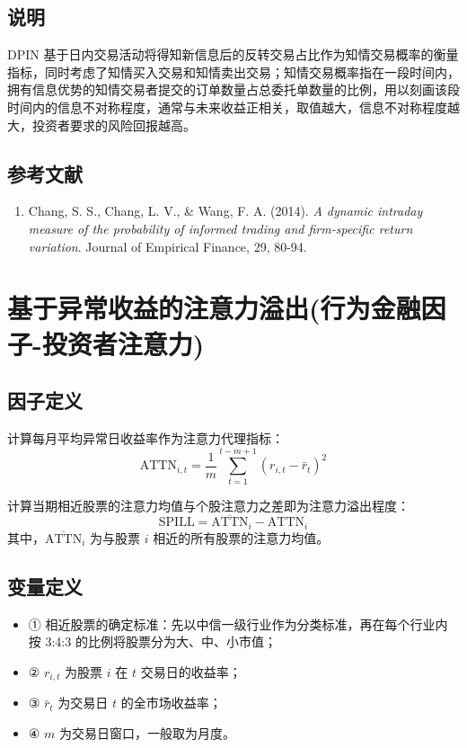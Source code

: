 \documentclass{article}
\begin{document}
\subsection{说明}
DPIN 基于日内交易活动将得知新信息后的反转交易占比作为知情交易概率的衡量指标，同时考虑了知情买入交易和知情卖出交易；知情交易概率指在一段时间内，拥有信息优势的知情交易者提交的订单数量占总委托单数量的比例，用以刻画该段时间内的信息不对称程度，通常与未来收益正相关，取值越大，信息不对称程度越大，投资者要求的风险回报越高。

\subsection{参考文献}
\begin{enumerate}
    \item Chang, S. S., Chang, L. V., \& Wang, F. A. (2014). \textit{A dynamic intraday measure of the probability of informed trading and firm-specific return variation}. Journal of Empirical Finance, 29, 80-94.
\end{enumerate}

\section{基于异常收益的注意力溢出(行为金融因子-投资者注意力)}

\subsection{因子定义}

计算每月平均异常日收益率作为注意力代理指标：
\begin{equation}
    \mathrm{ATTN}_{i,t} = \frac{1}{m} \sum_{t=1}^{t-m+1} (r_{i,t} - \bar{r}_t)^2
\end{equation}

计算当期相近股票的注意力均值与个股注意力之差即为注意力溢出程度：
\begin{equation}
    \mathrm{SPILL} = \overline{\mathrm{ATTN}}_{i} - \mathrm{ATTN}_{i}
\end{equation}
其中，\(\overline{\mathrm{ATTN}}_{i}\) 为与股票 \( i \) 相近的所有股票的注意力均值。

\subsection{变量定义}
\begin{itemize}
    \item ① 相近股票的确定标准：先以中信一级行业作为分类标准，再在每个行业内按 3:4:3 的比例将股票分为大、中、小市值；
    \item ② \( r_{i,t} \) 为股票 \( i \) 在 \( t \) 交易日的收益率；
    \item ③ \( \bar{r}_t \) 为交易日 \( t \) 的全市场收益率；
    \item ④ \( m \) 为交易日窗口，一般取为月度。
\end{itemize}
\end{document}

